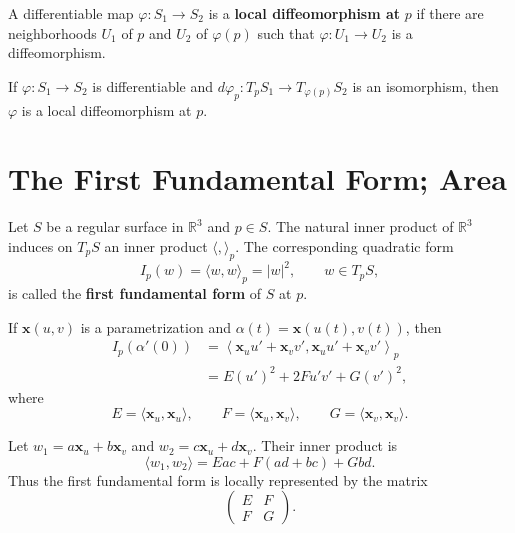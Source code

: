 \documentclass[12pt, oneside]{book}
\begin{document}
\begin{definition}
    A differentiable map $\varphi:S_1\rightarrow S_2$ is a
    \textbf{local diffeomorphism at} $p$ if there are neighborhoods
    $U_1$ of $p$ and $U_2$ of $\varphi(p)$ such that
    $\varphi:U_1\rightarrow U_2$ is a diffeomorphism.
\end{definition}

\begin{proposition}
    If $\varphi:S_1\rightarrow S_2$ is differentiable and
    $d\varphi_p:T_pS_1\rightarrow T_{\varphi(p)}S_2$ is an isomorphism, then
    $\varphi$ is a local diffeomorphism at $p$.
\end{proposition}

\section{The First Fundamental Form; Area}

\begin{definition}
    Let $S$ be a regular surface in $\mathbb{R}^3$ and $p\in S$.  The natural
    inner product of $\mathbb{R}^3$ induces on $T_pS$ an inner product
    $\langle,\rangle_p$.  The corresponding quadratic form
    \[
        I_p(w)=\langle w,w\rangle_p=|w|^2,\qquad w\in T_pS,
    \]
    is called the \textbf{first fundamental form} of $S$ at $p$.
\end{definition}

\begin{remark}
    If $\mathbf{x}(u,v)$ is a parametrization and
    $\alpha(t)=\mathbf{x}(u(t),v(t))$, then
    \[
        \begin{aligned}
            I_p(\alpha'(0))
             & =
            \left\langle
            \mathbf{x}_u u' + \mathbf{x}_v v',
            \mathbf{x}_u u' + \mathbf{x}_v v'
            \right\rangle_p              \\
             & = E(u')^2+2Fu'v'+G(v')^2,
        \end{aligned}
    \]
    where
    \[
        E=\langle \mathbf{x}_u,\mathbf{x}_u\rangle,\qquad
        F=\langle \mathbf{x}_u,\mathbf{x}_v\rangle,\qquad
        G=\langle \mathbf{x}_v,\mathbf{x}_v\rangle .
    \]
\end{remark}

\begin{definition}
    Let $w_1=a\mathbf{x}_u+b\mathbf{x}_v$ and
    $w_2=c\mathbf{x}_u+d\mathbf{x}_v$.  Their inner product is
    \[
        \langle w_1,w_2\rangle
        =Eac+F(ad+bc)+Gbd .
    \]
    Thus the first fundamental form is locally represented by the matrix
    \[
        \begin{pmatrix}
            E & F \\
            F & G
        \end{pmatrix}.
    \]
\end{definition}
\end{document}
